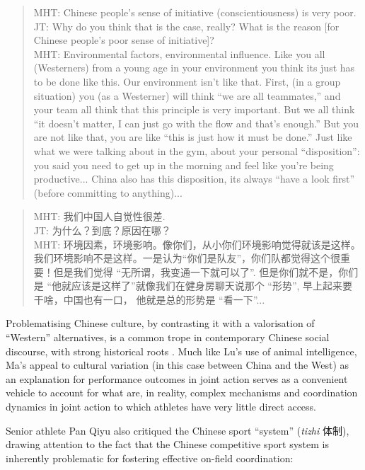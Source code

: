 \begin{CJK}{UTF8}{gbsn}
\begin{quote}
  MHT: Chinese people's sense of initiative (conscientiousness) is very poor.\\
  JT: Why do you think that is the case, really? What is the reason [for Chinese people's poor sense of initiative]? \\ MHT: Environmental factors, environmental influence.  Like you all (Westerners) from a young age in your environment you think its just has to be done like this.  Our environment isn’t like that.  First, (in a group situation) you (as a Westerner) will think ``we are all teammates,'' and your team all think that this principle is very important.  But we all think ``it doesn’t matter, I can just go with the flow and that’s enough.''  But you are not like that, you are like ``this is just how it must be done.'' Just like what we were talking about in the gym, about your personal ``disposition'': you said you need to get up in the morning and feel like you're being productive... China also has this disposition, its always ``have a look first'' (before committing to anything)...
\end{quote}

\begin{quote}
  MHT: 我们中国人自觉性很差. \\
  JT: 为什么？到底？原因在哪？\\
  MHT: 环境因素，环境影响。像你们，从小你们环境影响觉得就该是这样。我们环境影响不是这样。一是认为``你们是队友''，你们队都觉得这个很重要！但是我们觉得 ``无所谓，我变通一下就可以了''. 但是你们就不是，你们是 ``他就应该是这样了''就像我们在健身房聊天说那个 ``形势'', 早上起来要干啥，中国也有一口， 他就是总的形势是  ``看一下''...
\end{quote}

Problematising Chinese culture, by contrasting it with a valorisation of ``Western'' alternatives, is a common trope in contemporary Chinese social discourse, with strong historical roots \citep{Liu1995a}.  Much like Lu's use of animal intelligence, Ma's appeal to cultural variation (in this case between China and the West) as an explanation for performance outcomes in joint action serves as a convenient vehicle to account for what are, in reality, complex mechanisms and coordination dynamics in joint action to which athletes have very little direct access.

Senior athlete Pan Qiyu also critiqued the Chinese sport ``system'' (\textit{tizhi} 体制), drawing attention to the fact that the Chinese competitive sport system is inherently problematic for fostering effective on-field coordination:


\end{CJK}

